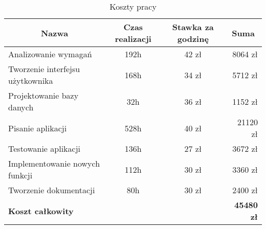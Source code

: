 

  \begin{table}[ht]
  \begin{center}
  \caption{Koszty pracy}
  \begin{tabular}{| l | c | c | r |}
    \hline
      \multicolumn{1}{|c|}{Nazwa} & \multicolumn{1}{|c|}{Czas realizacji} & \multicolumn{1}{|c|}{Stawka za godzinę} & \multicolumn{1}{|c|}{Suma} \\
    \hline
      Analizowanie wymagań & 192h & 42 zł & 8064 zł \\
    \hline
      Tworzenie interfejsu użytkownika & 168h  & 34 zł & 5712 zł \\
    \hline
      Projektowanie bazy danych & 32h & 36 zł & 1152 zł \\
    \hline
      Pisanie aplikacji & 528h  & 40 zł & 21120 zł \\
    \hline
      Testowanie aplikacji & 136h & 27 zł & 3672 zł \\
    \hline
      Implementowanie nowych funkcji & 112h & 30 zł & 3360 zł \\
    \hline
      Tworzenie dokumentacji & 80h & 30 zł & 2400 zł \\
    \hline
      \multicolumn{3}{|l}{\textbf{Koszt całkowity}} & \textbf{45480 zł} \\
    \hline
  \end{tabular}
  \end{center}
  \end{table}

